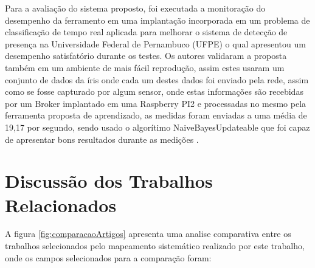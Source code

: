 \documentclass[ti,table]{texufpel} %
\begin{document}
	 Para a avaliação do sistema proposto, foi executada a monitoração do desempenho da ferramento em uma implantação incorporada em um problema de classificação de tempo real aplicada para melhorar o sistema de detecção de presença na Universidade Federal de Pernambuco (UFPE) o qual apresentou um desempenho satisfatório durante os testes. Os autores validaram a proposta também em um ambiente de mais fácil reprodução, assim estes usaram um conjunto de dados da íris onde cada um destes dados foi enviado pela rede, assim como se fosse capturado por algum sensor,  onde estas informações são recebidas por um Broker implantado em uma Raspberry PI2 e processadas no mesmo pela ferramenta proposta de aprendizado, as medidas foram enviadas a uma média de 19,17 por segundo, sendo usado o algorítimo NaiveBayesUpdateable que foi capaz de apresentar bons resultados durante as medições \cite{art10soto2016ceml}.


\section{Discussão dos Trabalhos Relacionados}
 A figura \ref{fig:comparacaoArtigos} apresenta uma analise comparativa entre os trabalhos selecionados pelo mapeamento sistemático realizado por este trabalho, onde os campos selecionados para a comparação foram: 
 
\end{document}
